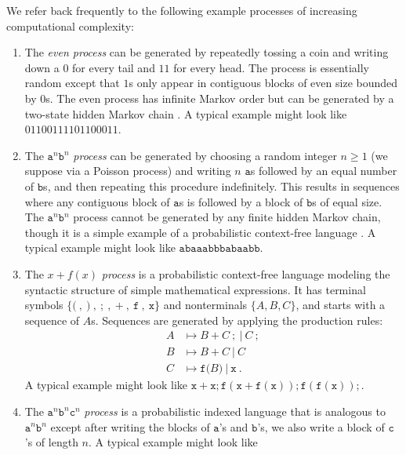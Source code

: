 \documentclass[draft,aps,pre,twocolumn,groupaddress,showkeys,nofootinbib,preprintnumbers,floatfix]{revtex4-2}
\begin{document}
We refer back frequently to the following example processes of increasing
computational complexity:
\begin{enumerate}
      \setlength{\topsep}{-2pt}
      \setlength{\itemsep}{-2pt}
      \setlength{\parsep}{-2pt}
\item The \emph{even process} can be generated by repeatedly tossing a coin
	and writing down a $0$ for every tail and $11$ for every head. The process
	is essentially random except that $1$s only appear in contiguous blocks of
	even size bounded by $0$s. The even process has infinite Markov order but
	can be generated by a two-state hidden Markov chain \cite{Crut01a}. A
	typical example might look like $01100111101100011$.
\item The $\mathtt{a}^n \mathtt{b}^n$ \emph{process} can be generated by
	choosing a random integer $n\geq 1$ (we suppose via a Poisson process) and
	writing $n$ $\mathtt{a}$s followed by an equal number of $\mathtt{b}$s,
	and then repeating this procedure indefinitely. This results in sequences
	where any contiguous block of $\mathtt{a}$s is followed by a block of
	$\mathtt{b}$s of equal size. The $\mathtt{a}^n \mathtt{b}^n$ process cannot
	be generated by any finite hidden Markov chain, though it is a simple
	example of a probabilistic context-free language \cite{Hopc06a}. A typical
	example might look like $\mathtt{abaaabbbabaabb}$.
\item The $x+f(x)$ \emph{process} is a probabilistic context-free language
	modeling the syntactic structure of simple mathematical expressions. It has
	terminal symbols $\{\mathtt{(}\ ,\ \mathtt{)}\ ,\ \mathtt{;}\ ,\
	\mathtt{+}\ ,\ \mathtt{f}\ ,\ \mathtt{x}\}$ and nonterminals $\{A,B,C\}$,
	and starts with a sequence of $A$s. Sequences are generated by applying the
	production rules:
\begin{align*}
    A &\mapsto B\ \mathtt{+}\ C\ \mathtt{;}\ |\ C\ \mathtt{;}\\
    B &\mapsto B\ \mathtt{+}\ C\ |\ C\\
    C &\mapsto \mathtt{f(}B\mathtt{)}\ |\ \mathtt{x}
  ~.
\end{align*}
	A typical example might look like $\mathtt{x+x;f(x+f(x));f(f(x));}$.
\item The $\mathtt{a}^n \mathtt{b}^n \mathtt{c}^n$ \emph{process} is a
	probabilistic indexed language \cite{Hopc06a} that is analogous to
	$\mathtt{a}^n \mathtt{b}^n$ except after writing the blocks of
	$\mathtt{a}$'s and $\mathtt{b}$'s, we also write a block of $\mathtt{c}$'s
	of length $n$. A typical example might look like

\end{enumerate}
\end{document}
